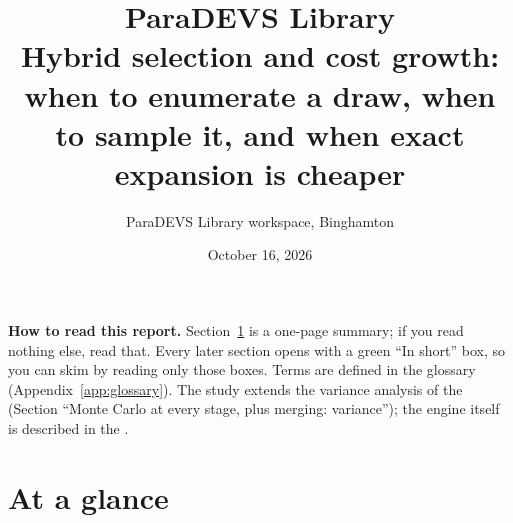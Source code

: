\documentclass[11pt]{article}
\title{\textbf{ParaDEVS Library}\\[4pt]\large Hybrid selection and cost growth: when to enumerate a draw, when to
sample it, and when exact expansion is cheaper}
\author{ParaDEVS Library workspace, Binghamton}
\date{October 16, 2026}
\begin{document}
\maketitle

\begin{center}
\begin{minipage}{0.88\linewidth}\small
\textbf{How to read this report.} Section~\ref{sec:glance} is a one-page summary; if you read nothing else, read
that. Every later section opens with a green ``In short'' box, so you can skim by reading only those boxes. Terms are
defined in the glossary (Appendix~\ref{app:glossary}). The study extends the variance analysis of the
 (Section ``Monte Carlo at every stage, plus merging: variance''); the
engine itself is described in the .
\end{minipage}
\end{center}

\relateddocs

\tableofcontents
\newpage

\section{At a glance}\label{sec:glance}
\end{document}

